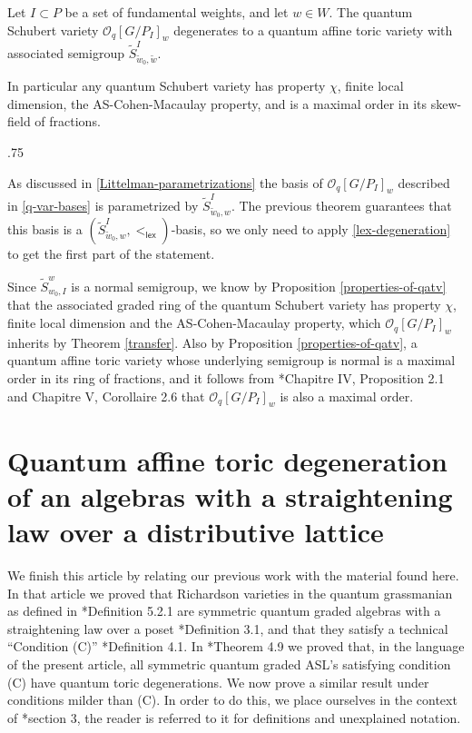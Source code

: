 \documentclass[11pt,fleqn]{article}
\makeatletter
\renewenvironment{proof}[1][\textit{Proof}]{\par
  \pushQED{\qed}%
  \normalfont \topsep.75\paraskip\relax
  \trivlist
  \item[\hskip\labelsep
        \itshape
    #1\@addpunct{.}]\ignorespaces
}{%
  \popQED\endtrivlist\@endpefalse
}
\renewcommand\O{\mathcal O}
\newcommand\lex{\mathsf{lex}}
\makeatother
\begin{document}
\begin{Theorem}
\label{Schubert-deg}
Let $I \subset P$ be a set of fundamental weights, and let $w \in W$.
The quantum Schubert variety $\O_q[G/P_I]_w$ degenerates to a quantum affine toric 
variety with associated semigroup $\tilde S^I_{\tilde w_0, \tilde w}$. 

In particular any quantum Schubert variety has property $\chi$, finite local dimension, 
the AS-Cohen-Macaulay property, and is a maximal order in its skew-field of fractions.
\end{Theorem}
\begin{proof}
As discussed in \ref{Littelman-parametrizations} the basis of $\O_q[G/P_I]_w$ described
in \ref{q-var-bases} is parametrized by $\tilde S^I_{\tilde w_0, w}$. The previous theorem
guarantees that this basis is a $(\tilde S^I_{\tilde w_0, w},<_{\lex})$-basis, so we
only need to apply \ref{lex-degeneration} to get the first part of the statement.

Since $\tilde S^w_{w_0, I}$ is a normal semigroup, we know by Proposition 
\ref{properties-of-qatv} that the associated graded ring of the quantum Schubert variety
has property $\chi$, finite local dimension and the AS-Cohen-Macaulay property, which 
$\O_q[G/P_I]_w$ inherits by Theorem \ref{transfer}. Also by Proposition 
\ref{properties-of-qatv}, a quantum affine toric variety whose underlying semigroup is 
normal is a maximal order in its ring of fractions, and it follows from 
\cite{Mau}*{Chapitre IV, Proposition 2.1 and Chapitre V, Corollaire 2.6} that 
$\O_q[G/P_I]_w$ is also a maximal order. 
\end{proof}


\section{Quantum affine toric degeneration of an algebras with a straightening law over 
a distributive lattice}
\label{richardson}

We finish this article by relating our previous work \cite{RZ} with the material found 
here. In that article we proved that Richardson varieties in the quantum grassmanian as 
defined in \cite{RZ}*{Definition 5.2.1} are symmetric quantum graded algebras with a 
straightening law over a poset \cite{RZ}*{Definition 3.1}, and that they satisfy a 
technical ``Condition (C)'' \cite{RZ}*{Definition 4.1}. In \cite{RZ}*{Theorem 4.9} we 
proved that, in the language of the present article, all symmetric quantum graded ASL's 
satisfying condition (C) have quantum toric degenerations. We now prove a similar result
under conditions milder than (C). In order to do this, we place 
ourselves in the context of \cite{RZ2}*{section 3}, the reader is referred to it for 
definitions and unexplained notation.
\end{document}
